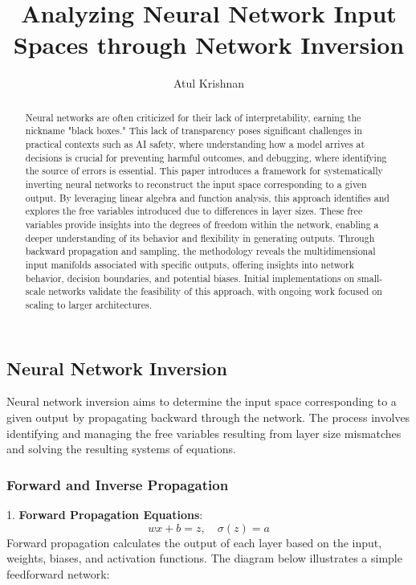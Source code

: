 \documentclass{article}
\title{Analyzing Neural Network Input Spaces through Network Inversion}
\author{Atul Krishnan}
\begin{document}
\maketitle 





\begin{abstract}
Neural networks are often criticized for their lack of interpretability, earning the nickname "black boxes." This lack of transparency poses significant challenges in practical contexts such as AI safety, where understanding how a model arrives at decisions is crucial for preventing harmful outcomes, and debugging, where identifying the source of errors is essential. This paper introduces a framework for systematically inverting neural networks to reconstruct the input space corresponding to a given output. By leveraging linear algebra and function analysis, this approach identifies and explores the free variables introduced due to differences in layer sizes. These free variables provide insights into the degrees of freedom within the network, enabling a deeper understanding of its behavior and flexibility in generating outputs. Through backward propagation and sampling, the methodology reveals the multidimensional input manifolds associated with specific outputs, offering insights into network behavior, decision boundaries, and potential biases. Initial implementations on small-scale networks validate the feasibility of this approach, with ongoing work focused on scaling to larger architectures.
\end{abstract}



\subsection*{Neural Network Inversion}
Neural network inversion aims to determine the input space corresponding to a given output by propagating backward through the network. The process involves identifying and managing the free variables resulting from layer size mismatches and solving the resulting systems of equations.

\subsubsection*{Forward and Inverse Propagation}

1. \textbf{Forward Propagation Equations}:
\[
wx + b = z, \quad \sigma(z) = a
\]
Forward propagation calculates the output of each layer based on the input, weights, biases, and activation functions. The diagram below illustrates a simple feedforward network:
\end{document}

